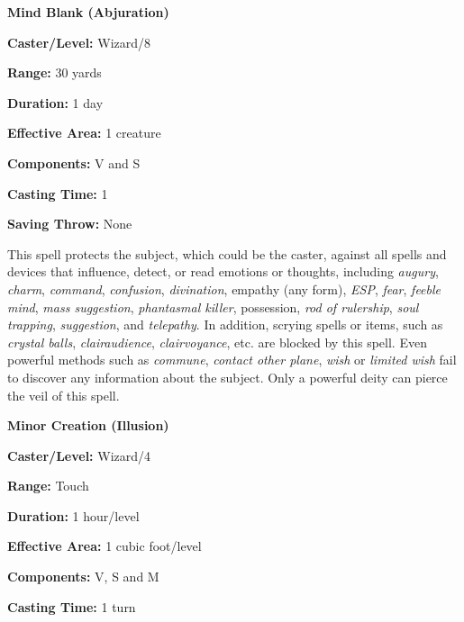 \begin{multicols}{2}
\vspace{1em}

\noindent
\begin{minipage}{\columnwidth}

\noindent \textbf{Mind Blank (Abjuration)}

\noindent \textbf{Caster/Level:} Wizard/8

\noindent \textbf{Range:} 30 yards

\noindent \textbf{Duration:} 1 day

\noindent \textbf{Effective Area:} 1 creature

\noindent \textbf{Components:} V and S

\noindent \textbf{Casting Time:} 1

\noindent \textbf{Saving Throw:} None

\end{minipage}

This spell protects the subject, which could be the caster, against all spells and devices that influence, detect, or read emotions or thoughts, including \textit{augury}, \textit{charm}, \textit{command}, \textit{confusion}, \textit{divination}, empathy (any form), \textit{ESP}, \textit{fear}, \textit{feeble mind}, \textit{mass suggestion}, \textit{phantasmal killer}, possession, \textit{rod of rulership}, \textit{soul trapping}, \textit{suggestion}, and \textit{telepathy}.  In addition, scrying spells or items, such as \textit{crystal balls}, \textit{clairaudience}, \textit{clairvoyance}, etc. are blocked by this spell.  Even powerful methods such as \textit{commune}, \textit{contact other plane}, \textit{wish} or \textit{limited wish} fail to discover any information about the subject.  Only a powerful deity can pierce the veil of this spell.  

\vspace{1em}

\noindent
\begin{minipage}{\columnwidth}

\noindent \textbf{Minor Creation (Illusion)}

\noindent \textbf{Caster/Level:} Wizard/4

\noindent \textbf{Range:} Touch

\noindent \textbf{Duration:} 1 hour/level

\noindent \textbf{Effective Area:} 1 cubic foot/level

\noindent \textbf{Components:} V, S and M

\noindent \textbf{Casting Time:} 1 turn


\end{minipage}
\end{multicols}
